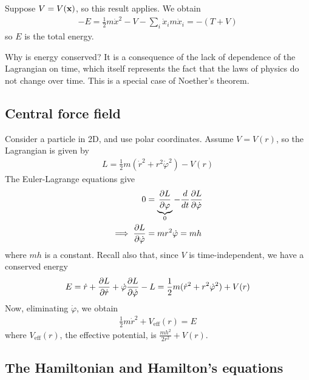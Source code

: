 \documentclass{../../template/note}
\begin{document}
    \begin{example*}
        Suppose $V = V(\V x)$, so this result applies. We obtain
        \begin{align*}
            -E = \frac 1 2 m \dot x^2 - V - \sum_i \dot x_i m \dot x_i = -(T+V)
        \end{align*}
        so $E$ is the total energy.        
    \end{example*}
    
    \begin{remark*}
        Why is energy conserved? It is a consequence of the lack of dependence of the Lagrangian on time, which itself represents the fact that the laws of physics do not change over time. This is a special case of Noether's theorem.
    \end{remark*}
    
    \subsection{Central force field}
    
    Consider a particle in 2D, and use polar coordinates. Assume $V = V(r)$, so the Lagrangian is given by
    \begin{align*}
        L = \frac 1 2 m(\dot r^2 + r^2 \dot \varphi^2) - V(r)
    \end{align*}
    The Euler-Lagrange equations give
    \begin{align*}
        0 &= \underbrace{\pd{L}{\varphi}}_0 - \frac d {dt} \pd{L}{\dot \varphi} \\
        \implies \pd{L}{\dot \varphi} &= mr^2 \dot \varphi = mh
    \end{align*}
    where $mh$ is a constant. Recall also that, since $V$ is time-independent, we have a conserved energy
    \begin{align*}
        E = \dot r + \pd{L}{\dot r} + \dot \varphi \pd{L}{\dot \varphi} - L = \frac 1 2 m(\dot r^2 + r^2 \dot \varphi^2) + V(r)
    \end{align*}
    Now, eliminating $\dot \varphi$, we obtain
    \begin{align*}
        \frac 1 2 m \dot r^2 + V_\text{eff}(r) = E
    \end{align*}
    where $V_\text{eff}(r)$, the effective potential, is $\frac{mh^2}{2r^2} + V(r)$.
    
    \subsection{The Hamiltonian and Hamilton's equations}
\end{document}
